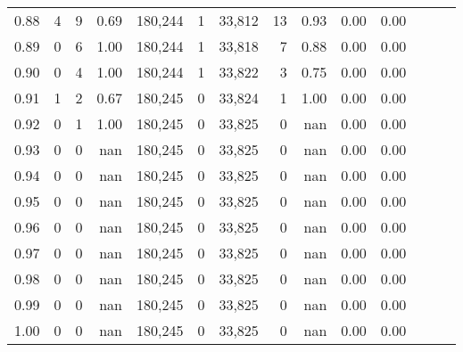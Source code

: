 \begin{tabular}{rrrrrrrrrrrrrr}
0.88 &       4 &      9 &  0.69 &  180,244 &        1 &  33,812 &      13 &  0.93 &  0.00 &      0.00 \\
0.89 &       0 &      6 &  1.00 &  180,244 &        1 &  33,818 &       7 &  0.88 &  0.00 &      0.00 \\
0.90 &       0 &      4 &  1.00 &  180,244 &        1 &  33,822 &       3 &  0.75 &  0.00 &      0.00 \\
0.91 &       1 &      2 &  0.67 &  180,245 &        0 &  33,824 &       1 &  1.00 &  0.00 &      0.00 \\
0.92 &       0 &      1 &  1.00 &  180,245 &        0 &  33,825 &       0 &   nan &  0.00 &      0.00 \\
0.93 &       0 &      0 &   nan &  180,245 &        0 &  33,825 &       0 &   nan &  0.00 &      0.00 \\
0.94 &       0 &      0 &   nan &  180,245 &        0 &  33,825 &       0 &   nan &  0.00 &      0.00 \\
0.95 &       0 &      0 &   nan &  180,245 &        0 &  33,825 &       0 &   nan &  0.00 &      0.00 \\
0.96 &       0 &      0 &   nan &  180,245 &        0 &  33,825 &       0 &   nan &  0.00 &      0.00 \\
0.97 &       0 &      0 &   nan &  180,245 &        0 &  33,825 &       0 &   nan &  0.00 &      0.00 \\
0.98 &       0 &      0 &   nan &  180,245 &        0 &  33,825 &       0 &   nan &  0.00 &      0.00 \\
0.99 &       0 &      0 &   nan &  180,245 &        0 &  33,825 &       0 &   nan &  0.00 &      0.00 \\
1.00 &       0 &      0 &   nan &  180,245 &        0 &  33,825 &       0 &   nan &  0.00 &      0.00 \\
\bottomrule
\end{tabular}
